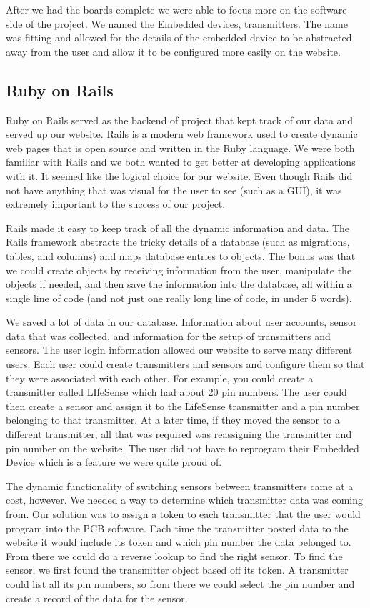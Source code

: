 \documentclass[letterpaper, 12 pt]{article}
\begin{document}
      After we had the boards complete we were able to focus more on the software side of the project. We named the Embedded devices, transmitters. The name was fitting and allowed for the details of the embedded device to be abstracted away from the user and allow it to be configured more easily on the website.  

\subsection{Ruby on Rails}
Ruby on Rails served as the backend of project that kept track of our data and served up our website. Rails is a modern web framework used to create dynamic web pages that is open source and written in the Ruby language. We were both familiar with Rails and we both wanted to get better at developing applications with it. It seemed like the logical choice for our website. Even though Rails did not have anything that was visual for the user to see (such as a GUI), it was extremely important to the success of our project.

  Rails made it easy to keep track of all the dynamic information and data. The Rails framework abstracts the tricky details of a database (such as migrations, tables, and columns) and maps database entries to objects. The bonus was that we could create objects by receiving information from the user, manipulate the objects if needed, and then save the information into the database, all within a single line of code (and not just one really long line of code, in under 5 words). 

  We saved a lot of data in our database. Information about user accounts, sensor data that was collected, and  information for the setup of transmitters and sensors. The user login information allowed our website to serve many different users. Each user could create transmitters and sensors and configure them so that they were associated with each other. For example, you could create a transmitter called LIfeSense which had about 20 pin numbers. The user could then create a sensor and assign it to the LifeSense transmitter and a pin number belonging to that transmitter. At a later time, if they moved the sensor to a different transmitter, all that was required was reassigning the transmitter and pin number on the website. The user did not have to reprogram their Embedded Device which is a feature we were quite proud of. 

  The dynamic functionality of switching sensors between transmitters came at a cost, however. We needed a way to determine which transmitter data was coming from. Our solution was to assign a token to each transmitter that the user would program into the PCB software. Each time the transmitter posted data to the website it would include its token and which pin number the data belonged to. From there we could do a reverse lookup to find the right sensor. To find the sensor, we first found the transmitter object based off its token. A transmitter could list all its pin numbers, so from there we could select the pin number and create a record of the data for the sensor.
\end{document}
